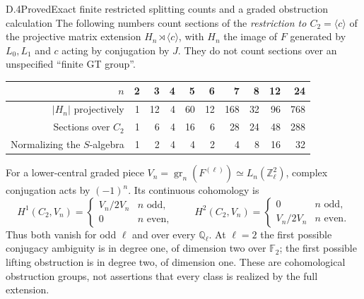 \begin{claim}{D.4}{Proved}{Exact finite restricted splitting counts and a graded obstruction calculation}
The following numbers count sections of the \emph{restriction to $C_2=\langle c\rangle$} of the projective matrix extension $H_n\rtimes\langle c\rangle$, with $H_n$ the image of $F$ generated by $L_0,L_1$ and $c$ acting by conjugation by $J$. They do not count sections over an unspecified ``finite GT group''.
\begin{center}
\begin{tabular}{rrrrrrrrrr}\toprule
$n$&2&3&4&5&6&7&8&12&24\\\midrule
$|H_n|$ projectively&1&12&4&60&12&168&32&96&768\\
Sections over $C_2$&1&6&4&16&6&28&24&48&288\\
Normalizing the $S$-algebra&1&2&4&4&2&4&8&16&32\\\bottomrule
\end{tabular}
\end{center}
For a lower-central graded piece $V_n=\operatorname{gr}_n(F^{(\ell)})\simeq L_n(\mathbb Z_\ell^2)$, complex conjugation acts by $(-1)^n$. Its continuous cohomology is
\[
 H^1(C_2,V_n)=
 \begin{cases}V_n/2V_n& n\text{ odd},\\0&n\text{ even},\end{cases}
 \qquad
 H^2(C_2,V_n)=
 \begin{cases}0&n\text{ odd},\\V_n/2V_n&n\text{ even}.
 \end{cases}
\]
Thus both vanish for odd $\ell$ and over every $\mathbb Q_\ell$. At $\ell=2$ the first possible conjugacy ambiguity is in degree one, of dimension two over $\mathbb F_2$; the first possible lifting obstruction is in degree two, of dimension one. These are cohomological obstruction groups, not assertions that every class is realized by the full extension.
\end{claim}


